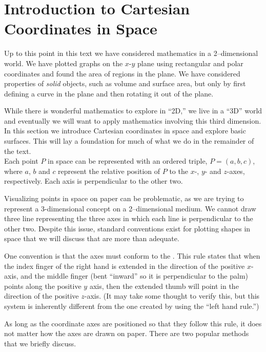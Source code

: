 \section{Introduction to Cartesian Coordinates in Space}\label{sec:space_coord}

Up to this point in this text we have considered mathematics in a 2--dimensional world. We have plotted graphs on the $x$-$y$ plane using rectangular and polar coordinates and found the area of regions in the plane. We have considered properties of \textit{solid} objects, such as volume and surface area, but only by first defining a curve in the plane and then rotating it out of the plane.

While there is wonderful mathematics to explore in ``2D,'' we live in a ``3D'' world and eventually we will want to apply mathematics involving this third dimension. In this section we introduce Cartesian coordinates in space and explore basic surfaces. This will lay a foundation for much of what we do in the remainder of the text.\\

Each point $P$ in space can be represented with an ordered triple, $P=(a,b,c)$, where $a$, $b$ and $c$ represent the relative position of $P$ to the $x$-, $y$- and $z$-axes, respectively. Each axis is perpendicular to the other two.

Visualizing points in space on paper can be problematic, as we are trying to represent a 3-dimensional concept on a 2--dimensional medium. We cannot draw three line representing the three axes in which each line is perpendicular to the other two. Despite this issue, standard conventions exist for plotting shapes in space that we will discuss that are more than adequate.

One convention is that the axes must conform to the . This rule states that when the index finger of the right hand is extended in the direction of the positive $x$-axis, and the middle finger (bent ``inward'' so it is perpendicular to the palm) points along the positive $y$ axis, then the extended thumb will point in the direction of the positive $z$-axis. (It may take some thought to verify this, but this system is inherently different from the one created by using the ``left hand rule.'')

As long as the coordinate axes are positioned so that they follow this rule, it does not matter how the axes are drawn on paper. There are two popular methods that we briefly discuss.

